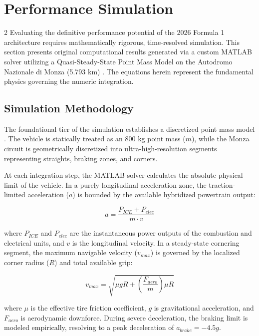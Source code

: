 \section{Performance Simulation}

\begin{multicols}{2}
Evaluating the definitive performance potential of the 2026 Formula 1 architecture requires mathematically rigorous, time-resolved simulation. This section presents original computational results generated via a custom MATLAB solver utilizing a Quasi-Steady-State Point Mass Model on the Autodromo Nazionale di Monza (5.793 km) \cite{monza_circuit_data}. The equations herein represent the fundamental physics governing the numeric integration.

\subsection{Simulation Methodology}

The foundational tier of the simulation establishes a discretized point mass model \cite{laptimesim_theory}. The vehicle is statically treated as an 800 kg point mass ($m$), while the Monza circuit is geometrically discretized into ultra-high-resolution segments representing straights, braking zones, and corners. 

At each integration step, the MATLAB solver calculates the absolute physical limit of the vehicle. In a purely longitudinal acceleration zone, the traction-limited acceleration ($a$) is bounded by the available hybridized powertrain output:

\begin{equation} \label{eq:sim_traction}
a = \frac{P_{ICE} + P_{elec}}{m \cdot v}
\end{equation}

where $P_{ICE}$ and $P_{elec}$ are the instantaneous power outputs of the combustion and electrical units, and $v$ is the longitudinal velocity. In a steady-state cornering segment, the maximum navigable velocity ($v_{max}$) is governed by the localized corner radius ($R$) and total available grip:

\begin{equation} \label{eq:sim_cornering}
v_{max} = \sqrt{\mu g R + \left( \frac{F_{aero}}{m} \right) \mu R}
\end{equation}

where $\mu$ is the effective tire friction coefficient, $g$ is gravitational acceleration, and $F_{aero}$ is aerodynamic downforce. During severe deceleration, the braking limit is modeled empirically, resolving to a peak deceleration of $a_{brake} = -4.5g$. 


\end{multicols}

